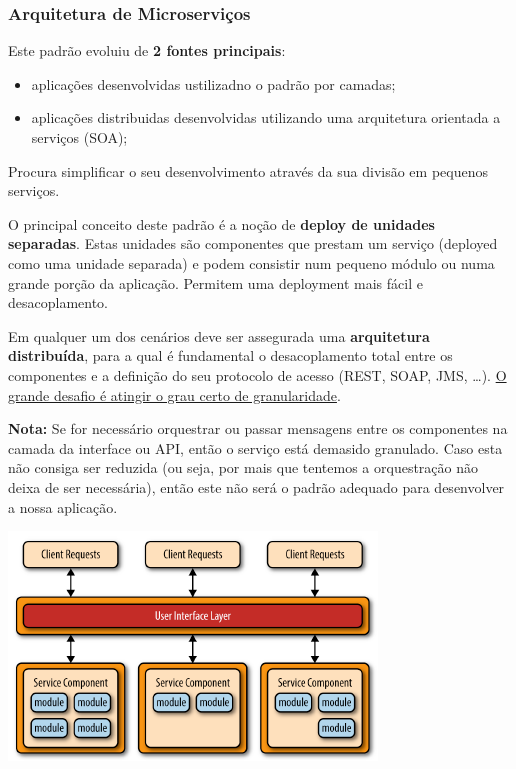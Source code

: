\documentclass{article}
\begin{document}
\subsubsection{Arquitetura de Microserviços}

Este padrão evoluiu de \textbf{2 fontes principais}:
\begin{itemize}
  \item aplicações desenvolvidas ustilizadno o padrão por camadas;
  \item aplicações distribuidas desenvolvidas utilizando uma arquitetura orientada a serviços (SOA);
\end{itemize}
Procura simplificar o seu desenvolvimento através da sua divisão em pequenos serviços.

\vspace{2mm}

O principal conceito deste padrão é a noção de \textbf{deploy de unidades
separadas}. Estas unidades são componentes que prestam um serviço (deployed
como uma unidade separada) e
podem consistir num pequeno módulo ou numa grande porção da
aplicação. Permitem uma deployment mais fácil e desacoplamento.

\vspace{2mm}

Em qualquer um dos cenários deve ser assegurada uma \textbf{arquitetura
distribuída}, para a qual é fundamental o desacoplamento total entre os
componentes e a definição do seu protocolo de acesso (REST, SOAP, JMS,
…). \uline{O grande desafio é atingir o grau certo de granularidade}.

\begin{flushleft}
  \textbf{Nota:} Se for necessário orquestrar ou passar mensagens entre os componentes na camada da interface ou API, então o
  serviço está demasido granulado. Caso esta não consiga ser reduzida (ou seja, por mais que tentemos a orquestração
  não deixa de ser necessária), então este não será o padrão adequado para desenvolver a nossa aplicação.
\end{flushleft}

\begin{center}
  \includegraphics[scale=0.5]{69}
\end{center}
\end{document}
